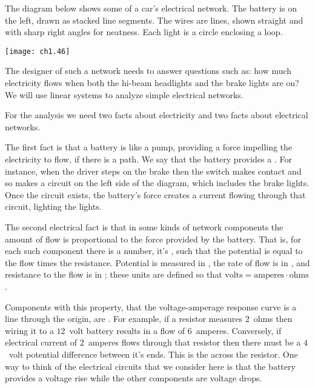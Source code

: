 The diagram below shows some of a car's electrical network.
The battery is on the left, drawn as stacked line segments. 
The wires are lines, shown straight and with sharp right angles
for neatness.
Each light is a circle enclosing a loop.
\begin{center}
  \texttt{[image: ch1.46]}
\end{center}
The designer of such a network needs to answer questions such as: 
how much electricity flows 
when both the hi-beam headlights and the brake lights are on?
We will use linear systems to analyze simple 
electrical networks. 

For the analysis we need two facts about electricity 
and two facts about electrical networks.

The first fact is that a battery is like a pump,  
providing a force impelling the electricity to flow, if there is a path.  
We say that the battery provides a 
.
For instance, when the driver steps on the brake then the switch makes contact
and so makes a circuit on the left side of the
diagram, which includes the brake lights. 
Once the circuit exists, the battery's force creates a
current flowing through that circuit, lighting the lights.

The second electrical fact is that in some 
kinds of network components
the amount of flow is proportional to the force provided by the battery.
That is, for each such component there is a number,  
it's ,
such that the potential is equal to the flow times the resistance.
Potential is measured in ,
the rate of flow is in ,
and resistance to the flow is in ;
these units are defined so that
$\mbox{volts}=\mbox{amperes}\cdot\mbox{ohms}$.

Components with this property,
that the voltage-amperage response curve is a line through the origin,
are .
For example, if a resistor measures $2$~ohms 
then wiring it to a $12$~volt battery 
results in a flow of $6$~amperes.
Conversely, if electrical current of
$2$~amperes flows through that resistor then there must be 
a $4$~volt potential difference between it's ends. 
This is the  across the 
resistor.
One way to think of the electrical circuits that we consider here
is that the battery provides a voltage rise while the other components 
are voltage drops.

